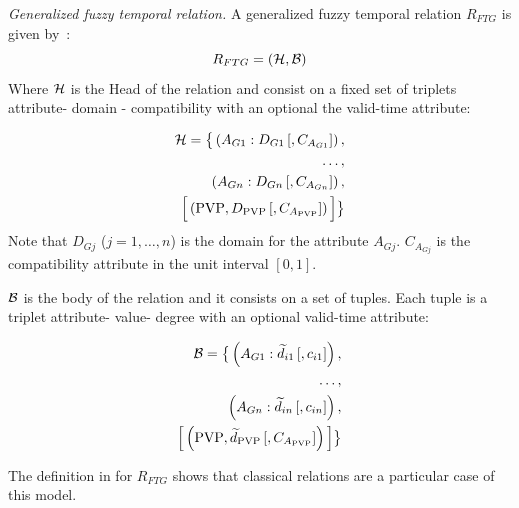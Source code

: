 \begin{definition}
\emph{Generalized fuzzy temporal relation.}
A generalized fuzzy temporal relation $R_{FTG}$ is given by~\cite{Medina1994}:
\label{def:generalized-fuzzy-temporal-relation}
\begin{equation}
\label{eq:generalized-fuzzy-temporal-relation}
R_{FTG} = \left(\mathcal{H}, \mathcal{B} \right)
\end{equation}
Where $\mathcal{H}$ is the Head of the relation and consist on a fixed set of triplets attribute- domain - compatibility with an optional the valid-time attribute:

\begin{align}
\label{eq:head-valid-time}
\mathcal{H} = \big \lbrace \left(A_{G1}:D_{G1}\left[,C_{A_{G1}} \right] \right),\\
\nonumber
 \ldots,\\
 \nonumber
  \left(A_{Gn}:D_{Gn}\left[,C_{A_{Gn}} \right] \right),\\
  \nonumber
  \Big[  \left( \text{PVP}, D_{\text{PVP}}\left[,C_{A_{\text{PVP}}} \right] \right) \Big] \big \rbrace
\end{align}
Note that $D_{Gj}$ ($j = 1, \ldots, n$) is the domain for the attribute $A_{Gj}$. $C_{A_{Gj}}$ is the compatibility attribute in the unit interval $\left[0, 1 \right]$.

$\mathcal{B}$ is the body of the relation and it consists on a set of tuples. Each tuple is a triplet attribute- value- degree with an optional valid-time attribute:

\begin{align}
\label{eq:body-valid-time}
\mathcal{B} = \big \lbrace \left(A_{G1}:\widetilde{d}_{i1}\left[,c_{i1} \right] \right),\\
\nonumber
 \ldots,\\
 \nonumber
  \left(A_{Gn}:\widetilde{d}_{in}\left[,c_{in} \right] \right),\\
  \nonumber
   \Big[  \left( \text{PVP}, \widetilde{d}_{\text{PVP}} \left[,C_{A_{\text{PVP}}} \right] \right)  \Big] \big \rbrace
\end{align}

\end{definition}


The definition in \cite{Medina1994} for $R_{FTG}$ shows that classical relations are a particular case of this model. 

